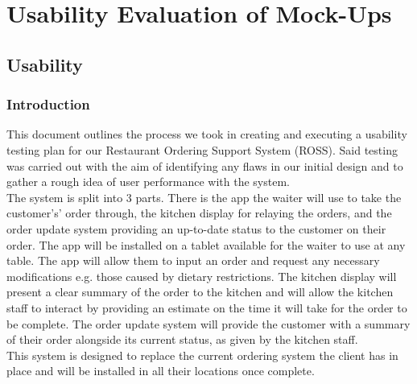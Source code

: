 \documentclass[11pt, a4paper]{report}
\begin{document}
\chapter{Usability Evaluation of Mock-Ups}
\pagebreak
\minitoc
\pagebreak
\section{Usability} 
\subsection{Introduction} 
This   document   outlines   the   process   we   took   in   creating   and   executing   a   usability testing   plan   for   our   Restaurant   Ordering   Support   System   (ROSS).   Said   testing   was carried   out   with   the   aim   of   identifying   any   flaws   in   our   initial   design   and   to   gather   a rough   idea   of   user   performance   with   the   system.\\
The   system   is   split   into   3   parts.   There   is   the   app   the   waiter   will   use   to   take   the customer's’   order   through,   the   kitchen   display   for   relaying   the   orders,   and   the   order update   system   providing   an   up-to-date   status   to   the   customer   on   their   order.   The app   will   be   installed   on   a   tablet   available   for   the   waiter   to   use   at   any   table.   The   app will   allow   them   to   input   an   order   and   request   any   necessary   modifications   e.g. those   caused   by   dietary   restrictions.   The   kitchen   display   will   present   a   clear summary   of   the   order   to   the   kitchen   and   will   allow   the   kitchen   staff   to   interact   by providing   an   estimate   on   the   time   it   will   take   for   the   order   to   be   complete.   The order   update   system   will   provide   the   customer   with   a   summary   of   their   order alongside   its   current   status,   as   given   by   the   kitchen   staff.\\
This   system   is   designed   to   replace   the   current   ordering   system   the   client   has   in place   and   will   be   installed   in   all   their   locations   once   complete.\\
\end{document}
